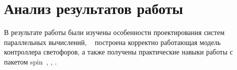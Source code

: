 \documentclass[a4papaer,12pt]{article}
\begin{document}
\section{Анализ результатов работы}

В результате работы были изучены особенности проектирования систем параллельных вычислений,
~\cite{verification} построена корректно работающая модель контроллера светофоров, а также получены практические
навыки работы с пакетом spin~\cite{spin}, \cite{spin2}, \cite{spin3}.

\pagebreak



\end{document}
